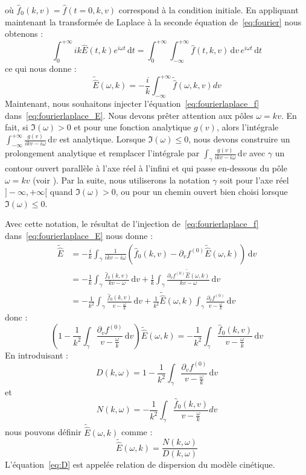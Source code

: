 où $\hat{f}_0(k,v) = \hat{f}(t=0,k,v)$ correspond à la condition initiale. En appliquant maintenant la transformée de Laplace à la seconde équation de~\eqref{eq:fourier} nous obtenons :
$$
  \int_0^{+\infty}ik\hat{E}(t,k)e^{i\omega t}\,\mathrm{d}t = \int_0^{+\infty}\int_{-\infty}^{+\infty}\hat{f}(t,k,v)\,\mathrm{d}v\,e^{i\omega t}\,\mathrm{d}t
$$
ce qui nous donne :
\begin{equation}
  \tilde{\hat{E}}(\omega,k)=-\frac{i}{k}\int_{-\infty}^{+\infty}\tilde{\hat{f}}(\omega,k,v)dv
  \label{eq:fourierlaplace_E}
\end{equation}
Maintenant, nous souhaitons injecter l'équation~\eqref{eq:fourierlaplace_f} dans~\eqref{eq:fourierlaplace_E}. Nous devons prêter attention aux pôles $\omega = kv$. En fait, si $\Im(\omega)>0$ et pour une fonction analytique $g(v)$, alors l'intégrale $\int_{-\infty}^{+\infty}\frac{g(v)}{ikv-i\omega}\,\mathrm{d}v$ est analytique. Lorsque $\Im(\omega) \leq 0$, nous devons construire un prolongement analytique et remplacer l'intégrale par $\int_\gamma \frac{g(v)}{ikv-i\omega}\,\mathrm{d}v$ avec $\gamma$ un contour ouvert parallèle à l'axe réel à l'infini et qui passe en-dessous du pôle $\omega = kv$ (voir \cite{Sonnendrucker:2015}). Par la suite, nous utiliserons la notation $\gamma$ soit pour l'axe réel $]-\infty,+\infty[$ quand $\Im(\omega)>0$, ou pour un chemin ouvert bien choisi lorsque $\Im(\omega)\leq 0$. 

Avec cette notation, le résultat de l'injection de~\eqref{eq:fourierlaplace_f} dans~\eqref{eq:fourierlaplace_E} nous donne :
$$
  \begin{aligned}
    \tilde{\hat{E}}
    & = -\frac{i}{k}\int_\gamma \frac{1}{ikv-i\omega}\left( \hat{f}_0(k,v) - \partial_vf^{(0)}\tilde{\hat{E}}(\omega,k) \right)\,\mathrm{d}v \\
    & = -\frac{1}{k}\int_\gamma \frac{\hat{f}_0(k,v)}{kv-\omega}\,\mathrm{d}v + \frac{1}{k}\int_\gamma \frac{\partial_v f^{(0)}\tilde{\hat{E}}(\omega,k)}{kv-\omega}\,\mathrm{d}v \\
    & = - \frac{1}{k^2}\int_\gamma \frac{\hat{f}_0(k,v)}{v-\frac{\omega}{k}}\,\mathrm{d}v + \frac{1}{k^2}\tilde{\hat{E}}(\omega,k)\int_\gamma \frac{\partial_v f^{(0)}}{v-\frac{\omega}{k}}\,\mathrm{d}v
  \end{aligned}
$$
donc :
$$
  \left( 1 - \frac{1}{k^2}\int_\gamma \frac{\partial_v f^{(0)}}{v-\frac{\omega}{k}}\,\mathrm{d}v \right) \tilde{\hat{E}}(\omega,k) = -\frac{1}{k^2}\int_\gamma \frac{\hat{f}_0(k,v)}{v-\frac{\omega}{k}}\,\mathrm{d}v
$$
En introduisant :
\begin{equation}
  D(k,\omega) = 1 - \frac{1}{k^2}\int_\gamma \frac{\partial_v f^{(0)}}{v-\frac{\omega}{k}}\,\mathrm{d}v
  \label{eq:D}
\end{equation}
et
\begin{equation}
  N(k,\omega) = -\frac{1}{k^2}\int_\gamma\frac{\hat{f}_0(k,v)}{v-\frac{\omega}{k}}dv
  \label{eq:N}
\end{equation}
nous pouvons définir $\tilde{\hat{E}}(\omega,k)$ comme :
$$
  \tilde{\hat{E}}(\omega,k) = \frac{N(k,\omega)}{D(k,\omega)}
$$
L'équation~\eqref{eq:D} est appelée relation de dispersion du modèle cinétique.

